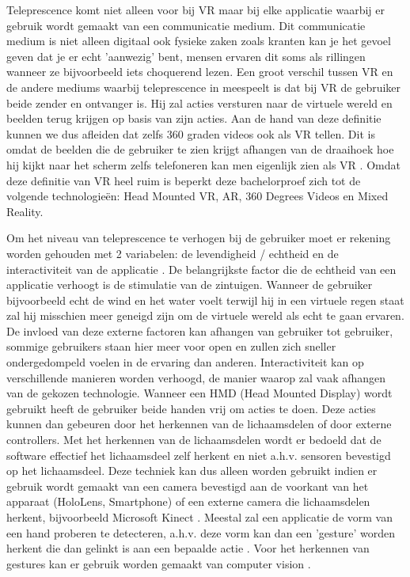 Teleprescence komt niet alleen voor bij VR maar bij elke applicatie waarbij er gebruik wordt gemaakt van een communicatie medium. Dit communicatie medium is niet alleen digitaal ook fysieke zaken zoals kranten kan je het gevoel geven dat je er echt 'aanwezig' bent, mensen ervaren dit soms als rillingen wanneer ze bijvoorbeeld iets choquerend lezen. 
Een groot verschil tussen VR en de andere mediums waarbij teleprescence in meespeelt is dat bij VR de gebruiker beide zender en ontvanger is. Hij zal acties versturen naar de virtuele wereld en beelden terug krijgen op basis van zijn acties.
Aan de hand van deze definitie kunnen we dus afleiden dat zelfs 360 graden videos ook als VR tellen. Dit is omdat de beelden die de gebruiker te zien krijgt afhangen van de draaihoek hoe hij kijkt naar het scherm zelfs telefoneren kan men eigenlijk zien als VR \autocite{Steuer1992}.
Omdat deze definitie van VR heel ruim is beperkt deze bachelorproef zich tot de volgende technologieën: Head Mounted VR, AR, 360 Degrees Videos en Mixed Reality.


Om het niveau van teleprescence te verhogen bij de gebruiker moet er rekening worden gehouden met 2 variabelen: de levendigheid / echtheid en de interactiviteit van de applicatie \autocite{Steuer1992}.
De belangrijkste factor die de echtheid van een applicatie verhoogt is de stimulatie van de zintuigen. Wanneer de gebruiker bijvoorbeeld echt de wind en het water voelt terwijl hij in een virtuele regen staat zal hij misschien meer geneigd zijn om de virtuele wereld als echt te gaan ervaren. De invloed van deze externe factoren kan afhangen van gebruiker tot gebruiker, sommige gebruikers staan hier meer voor open en zullen zich sneller ondergedompeld voelen in de ervaring dan anderen.
Interactiviteit kan op verschillende manieren worden verhoogd, de manier waarop zal vaak afhangen van de gekozen technologie. Wanneer een HMD (Head Mounted Display) wordt gebruikt heeft de gebruiker beide handen vrij om acties te doen. Deze acties kunnen dan gebeuren door het herkennen van de lichaamsdelen of door externe controllers.
Met het herkennen van de lichaamsdelen wordt er bedoeld dat de software effectief het lichaamsdeel zelf herkent en niet a.h.v. sensoren bevestigd op het lichaamsdeel. Deze techniek kan dus alleen worden gebruikt indien er gebruik wordt gemaakt van een camera bevestigd aan de voorkant van het apparaat (HoloLens, Smartphone) of een externe camera die lichaamsdelen herkent, bijvoorbeeld Microsoft Kinect \autocite{Ren2013}.
Meestal zal een applicatie de vorm van een hand proberen te detecteren, a.h.v. deze vorm kan dan een 'gesture' worden herkent die dan gelinkt is aan een bepaalde actie \autocite{Piumsomboon2013}. 
Voor het herkennen van gestures kan er gebruik worden gemaakt van computer vision \autocite{Ji2010}.

